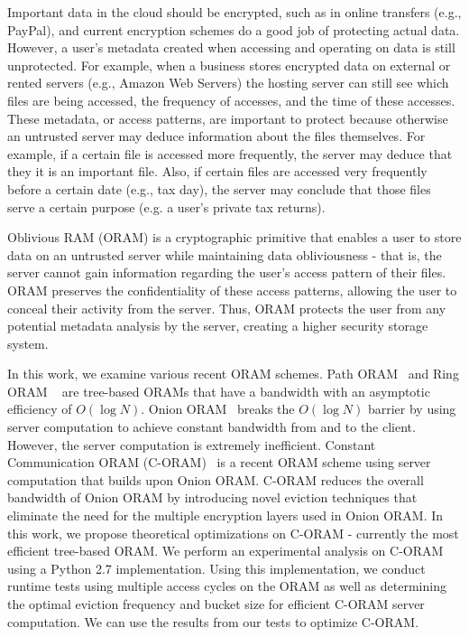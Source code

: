 \documentclass[12pt, oneside]{article}   	%
\begin{document}
Important data in the cloud should be encrypted, such as in online transfers (e.g., PayPal), and current encryption schemes do a good job of protecting actual data. However, a user's metadata created when accessing and operating on data is still unprotected. For example, when a business stores encrypted data on external or rented servers (e.g., Amazon Web Servers) the hosting server can still see which files are being accessed, the frequency of accesses, and the time of these accesses. These metadata, or access patterns, are important to protect because otherwise an untrusted server may deduce information about the files themselves. For example, if a certain file is accessed more frequently, the server may deduce that they it is an important file. Also, if certain files are accessed very frequently before a certain date (e.g., tax day), the server may conclude that those files serve a certain purpose (e.g. a user's private tax returns).

Oblivious RAM (ORAM) is a cryptographic primitive that enables a user to store data on an untrusted server while maintaining data obliviousness - that is, the server cannot gain information regarding the user's access pattern of their files. ORAM preserves the confidentiality of these access patterns, allowing the user to conceal their activity from the server. Thus, ORAM protects the user from any potential metadata analysis by the server, creating a higher security storage system.

In this work, we examine various recent ORAM schemes. Path ORAM~\cite{PathORAM} and Ring ORAM ~\cite{RingORAM} are tree-based ORAMs that have a bandwidth with an asymptotic efficiency of $O (\log N )$. Onion ORAM~\cite{OnionORAM} breaks the $O (\log N )$ barrier by using server computation to achieve constant bandwidth from and to the client. However, the server computation is extremely inefficient. Constant Communication ORAM (C-ORAM)~\cite{C-ORAM} is a recent ORAM scheme using server computation that builds upon Onion ORAM. C-ORAM reduces the overall bandwidth of Onion ORAM by introducing novel eviction techniques that eliminate the need for the multiple encryption layers used in Onion ORAM. In this work, we propose theoretical optimizations on C-ORAM - currently the most efficient tree-based ORAM. We perform an experimental analysis on C-ORAM using a Python 2.7 implementation. Using this implementation, we conduct runtime tests using multiple access cycles on the ORAM as well as determining the optimal eviction frequency and bucket size for efficient C-ORAM server computation. We can use the results from our tests to optimize C-ORAM.
\end{document}
